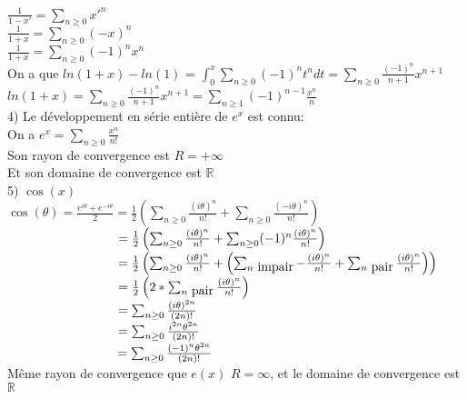 \documentclass{article}
\newcommand\tab[1][1cm]{\hspace*{#1}}
\begin{document}
$\frac{1}{1 - x'} = \sum_{n \geq 0} x'^n$\\
$\frac{1}{1 + x} = \sum_{n \geq 0} (-x)^n$\\
$\frac{1}{1 + x} = \sum_{n \geq 0} (-1)^n x^n$\\
On a que $ln(1 + x) - ln(1)$ = $\int_0^{x} \sum_{n \geq 0} (-1)^n t^n dt = \sum_{n \geq 0} \frac{(-1)^n}{n + 1} x^{n + 1}$\\
$ln(1 + x) = \sum_{n \geq 0} \frac{(-1)^n}{n + 1} x^{n + 1} = \sum_{n \geq 1} (-1)^{n - 1} \frac{x^n}{n}$\\
4) Le développement en série entière de $e^x$ est connu:\\
On a $e^x = \sum_{n \geq 0} \frac{x^n}{n!}$\\
Son rayon de convergence est $R = +\infty$\\
Et son domaine de convergence est $\mathbb{R}$\\
5) $\cos(x)$\\
$\cos(\theta) = \frac{e^{i \theta} + e^{-i \theta}}{2} = \frac{1}{2} \left(\sum_{n \geq 0} \frac{(i \theta)^n}{n!} + \sum_{n \geq 0} \frac{(-i \theta)^n}{n!}\right)$\\
$\tab[3.05cm] = \frac{1}{2} \left(\sum_{n \geq 0} \frac{(i \theta)^n}{n!} + \sum_{n \geq 0} (-1)^n \frac{(i \theta)^n}{n!}\right)$\\
$\tab[3.05cm] = \frac{1}{2} \left(\sum_{n \geq 0} \frac{(i \theta)^n}{n!} + \left(\sum_{n \mbox{ impair}} -\frac{(i \theta)^n}{n!} + \sum_{n \mbox{ pair}} \frac{(i \theta)^n}{n!}\right)\right)$\\
$\tab[3.05cm] = \frac{1}{2} \left(2 * \sum_{n \mbox{ pair}} \frac{(i \theta)^n}{n!}\right)$\\
$\tab[3.05cm] = \sum_{n \geq 0} \frac{(i \theta)^{2n}}{(2n)!}$\\
$\tab[3.05cm] = \sum_{n \geq 0} \frac{i^{2n}\theta^{2n}}{(2n)!}$\\
$\tab[3.05cm] = \sum_{n \geq 0} \frac{(-1)^{n}\theta^{2n}}{(2n)!}$\\
Même rayon de convergence que $e(x)$ $R = \infty$, et le domaine de convergence est $\mathbb{R}$\\
\end{document}
